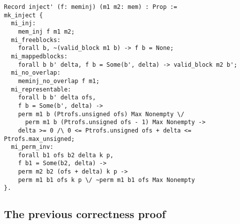 \begin{lstlisting}[basicstyle=\footnotesize]
Record inject' (f: meminj) (m1 m2: mem) : Prop :=
mk_inject {
  mi_inj:
    mem_inj f m1 m2;
  mi_freeblocks:
    forall b, ~(valid_block m1 b) -> f b = None;
  mi_mappedblocks:
    forall b b' delta, f b = Some(b', delta) -> valid_block m2 b';
  mi_no_overlap:
    meminj_no_overlap f m1;
  mi_representable:
    forall b b' delta ofs,
    f b = Some(b', delta) ->
    perm m1 b (Ptrofs.unsigned ofs) Max Nonempty \/
      perm m1 b (Ptrofs.unsigned ofs - 1) Max Nonempty ->
    delta >= 0 /\ 0 <= Ptrofs.unsigned ofs + delta <= Ptrofs.max_unsigned;
  mi_perm_inv:
    forall b1 ofs b2 delta k p,
    f b1 = Some(b2, delta) ->
    perm m2 b2 (ofs + delta) k p ->
    perm m1 b1 ofs k p \/ ~perm m1 b1 ofs Max Nonempty
}.
\end{lstlisting}

\subsection{The previous correctness proof}
\label{subsec:oldproof}
\def\oldproof{
    \begin{tikzpicture}[%
        every node/.style={rectangle, font=\small},
        shorten >=2pt,
        node distance=2cm
      ]
      \node (cc) {CompCert C};
      \node (cstrat) [right=of cc] {CStrategy};
      \node (clight) [right=of cstrat] {Clight};
      \node (dots) [right=of clight] {\dots\vphantom{C}};
      \node (mach) [right=of dots] {Mach};
      \node (asm) [right=of mach] {ASM};
      \node (atcstrat) [below=of cstrat] {\at{CStrategy}};
      \path [draw] (cc) edge[<-, above,line width=1pt] node {1. backward} (cstrat);
      \path [draw] (cstrat) edge[->, above,line width=1pt] node {1. forward} (clight);
      \path [draw] (clight) edge[->, above,line width=1pt] node {1. forward} (dots);
      \path [draw] (dots) edge[->, above,line width=1pt] node {1. forward} (mach);
      \path [draw] (mach) edge[->, above,line width=1pt] node {1. forward} (asm);
      \path [draw] (cstrat) edge[->, bend left=20, above,line width=1pt] node {2. forward} (asm);
      \path [draw] (atcstrat) edge[->, above left,line width=1pt] node {3. forward} (asm);
      \path [draw] (cc) edge[<-, bend right=20, above right,line width=1pt] node {4. backward} (atcstrat);
      \path [draw] (atcstrat) edge[<-, bend right=20, above left,line width=1pt] node {4. backward} (asm);
      \path [draw] (cc) edge[<-, bend right=70, below,line width=1pt] node {5. backward} (asm);
    \end{tikzpicture}
}


